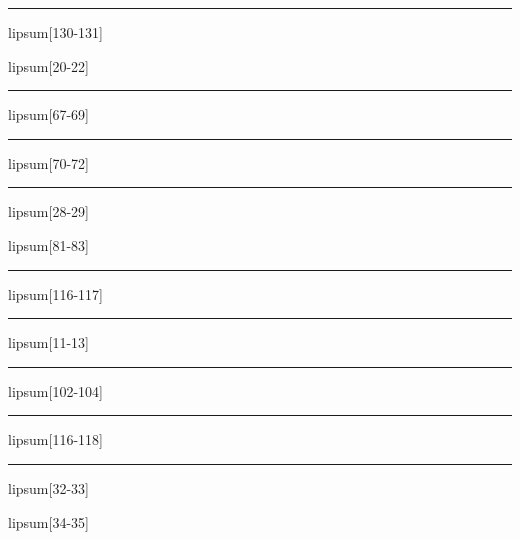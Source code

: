 \documentclass[11pt,a4paper]{article}
\begin{document}
\begin{simplewrap}
  \textcolor{lime!39}{\rule{5.9cm}{2.7cm}}
\end{simplewrap}
lipsum[130-131]

lipsum[20-22]

\begin{simplewrap}
  \textcolor{blue!37}{\rule{5.0cm}{3.0cm}}
\end{simplewrap}
lipsum[67-69]

\begin{simplewrap}
  \textcolor{pink!54}{\rule{5.5cm}{4.6cm}}
\end{simplewrap}
lipsum[70-72]

\begin{simplewrap}
  \textcolor{yellow!18}{\rule{5.3cm}{6.7cm}}
\end{simplewrap}
lipsum[28-29]

lipsum[81-83]

\begin{simplewrap}
  \textcolor{olive!17}{\rule{4.6cm}{9.7cm}}
\end{simplewrap}
lipsum[116-117]

\begin{simplewrap}
  \textcolor{teal!17}{\rule{3.3cm}{8.5cm}}
\end{simplewrap}
lipsum[11-13]

\begin{simplewrap}
  \textcolor{brown!19}{\rule{3.3cm}{4.0cm}}
\end{simplewrap}
lipsum[102-104]

\begin{simplewrap}
  \textcolor{violet!26}{\rule{5.5cm}{3.4cm}}
\end{simplewrap}
lipsum[116-118]

\begin{simplewrap}
  \textcolor{magenta!25}{\rule{3.3cm}{2.8cm}}
\end{simplewrap}
lipsum[32-33]

lipsum[34-35]
\end{document}
